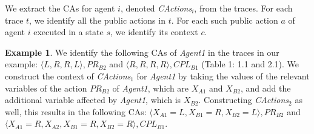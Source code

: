 \documentclass[letterpaper]{article}
\theoremstyle{definition}
\newtheorem{example}{Example}
\newcommand{\eliran}[1]{\textbf{[\color{red}ELIRAN:#1]}}
\newcommand{\ronen}[1]{\textbf{[\color{blue}RONEN:#1]}}
\newcommand{\guy}[1]{\textbf{[\color{orange}GUY:#1]}}
\newcommand{\cact}[1]{{\em CActions$_#1$}}
\begin{document}
We extract the CAs for agent $i$, denoted \cact{i}, from the traces.
For each trace $t$, we identify all the public actions in $t$. For each such public action $a$ of agent $i$ executed in a state $s$, we identify its context $c$.


\begin{example}
We identify the following CAs of \emph{Agent1} in the traces in our example:
$\langle L,R,R,L \rangle,PR_{B2}$ and $\langle R,R,R,R \rangle,CPL_{B1}$ (Table 1: 1.1 and 2.1). 
%
We construct the context of \cact{1} for \emph{Agent1} by taking the values of the relevant variables of the action $PR_{B2}$ of \emph{Agent1}, which are $X_{A1}$ and $X_{B2}$, and add the additional variable affected by \emph{Agent1}, which is $X_{B2}$. 
%
Constructing \cact{2} as well, this results in the following CAs: $\langle X_{A1}=L, X_{B1}=R, X_{B2}=L\rangle ,PR_{B2}$ and $\langle X_{A1}=R, X_{A2}, X_{B1}=R, X_{B2}=R\rangle ,CPL_{B1}$.
\end{example}
\end{document}

